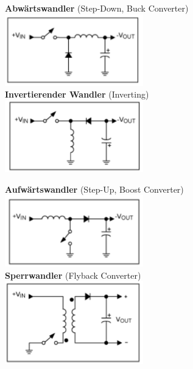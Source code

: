 		\begin{minipage}{8cm}
			\textbf{Abwärtswandler} (Step-Down, Buck Converter) \\
			\includegraphics[width=6cm]{images/buckConv} \\
			\textbf{Invertierender Wandler} (Inverting) \\
			\includegraphics[width=6cm]{images/invConv} \\
		\end{minipage}
		\begin{minipage}{8cm}
			\textbf{Aufwärtswandler} (Step-Up, Boost Converter) \\
			\includegraphics[width=6cm]{images/boostConv} \\
			\textbf{Sperrwandler} (Flyback Converter) \\
			\includegraphics[width=6cm]{images/flybackConv}
		\end{minipage}


